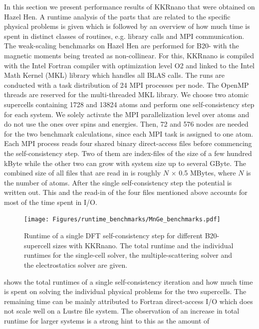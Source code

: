 \documentclass[graybox]{svmult}
\begin{document}
In this section we present performance results of KKRnano that were obtained on Hazel Hen.
A runtime analysis of the parts that are related to the specific physical problems is given
which is followed by an overview of how much time is spent in distinct
classes of routines, e.g. library calls and MPI communication.
The weak-scaling benchmarks on Hazel Hen are performed for B20- 
with the magnetic moments being treated as
non-collinear.
For this, KKRnano is compiled with the Intel Fortran compiler
with optimization level O2 and linked to the Intel Math Kernel (MKL) library which handles all BLAS calls.
The runs are conducted with a task distribution of 24 MPI processes per node. The OpenMP threads 
are reserved for the multi-threaded MKL library.
We choose two atomic supercells containing 1728 and 13824 atoms 
and perform one self-consistency step for each system.
We solely activate the MPI parallelization level over atoms and do not use the ones over spins and energies.
Then, 72 and 576  nodes
are needed for the two benchmark calculations, since each MPI task is assigned to one atom. 
Each MPI process reads four shared binary direct-access
files before commencing the self-consistency step.
Two of them are index-files of the size of a few hundred kByte while the other two can grow with system size
up to several GByte. The combined size of all files that are 
read in is roughly $N$ $\times$ 0.5 MBytes, where $N$ is the number of atoms. 
After the single self-consistency step 
the potential is written out. 
This and the read-in of the four files mentioned above accounts for most of the time spent in I/O.
\begin{figure}[htb]
\begin{center}
 \texttt{[image: Figures/runtime\_benchmarks/MnGe\_benchmarks.pdf]}
\end{center}
	\caption{Runtime of a single DFT self-consistency step
	for different B20- supercell sizes with KKRnano. 
	The total runtime and the individual runtimes for the single-cell solver,
	the multiple-scattering solver and the electrostatics solver are given.
	}
\label{fig:MnGe_6x6x6_benchmark}
\end{figure}
shows the total runtimes of a single self-consistency iteration and how much time is spent
on solving the individual physical problems for the two supercells.
The remaining time
can be mainly attributed to Fortran direct-access I/O which does not scale well on a Lustre file system.
The observation of an increase in total runtime for larger systems is a strong hint to this as the amount of
\end{document}
